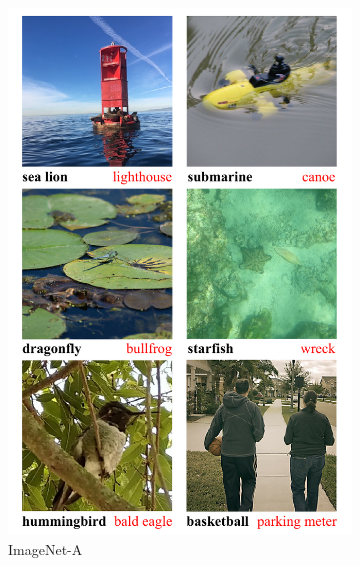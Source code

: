 \documentclass[10pt]{article}
\begin{document}
\begin{figure}[!htb]
	\begin{subfigure}{.33\textwidth}
		\centering
		\includegraphics[width=\linewidth]{fig/imagenet_a}
		\caption{ImageNet-A}
		\label{fig:imagenet_a}
	\end{subfigure}\hfill
	\begin{subfigure}{.33\textwidth}

\end{subfigure}
\end{figure}
\end{document}
